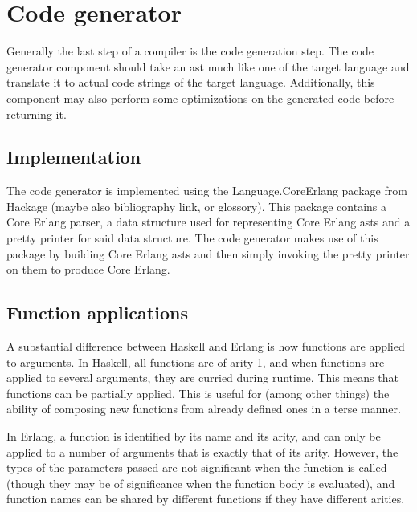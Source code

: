 \section{Code generator}


Generally the last step of a compiler is the code generation step. The code generator
component should take an \gls{ast} much like one of the target language and translate it
to actual code strings of the target language. Additionally, this component may also
perform some optimizations on the generated code before returning it.

\subsection{Implementation}

The code generator is implemented using the Language.CoreErlang \cite{CoreErlang} package
from Hackage (maybe also bibliography link, or glossory). This package contains a Core Erlang
parser, a data structure used for representing Core Erlang \gls{ast}s and a pretty printer for
said data structure. The code generator makes use of this package by building Core Erlang
\gls{ast}s and then simply invoking the pretty printer on them to  produce Core Erlang.

\subsection{Function applications}

A substantial difference between Haskell and Erlang is how functions are applied to arguments. 
In Haskell, all functions are of arity 1, and when functions are applied to several arguments, they are curried during runtime. This means that functions can be partially applied.%
This is useful for (among other things)
the ability of composing new functions from already defined ones in a terse manner.

In Erlang, a function is identified by its name and its arity, and can only be applied to a number of arguments that is exactly that of its arity. %
However, the types of the parameters passed are not significant when the function is called %
(though they may be of significance when the function body is evaluated), and function names can be shared by different functions if they have different arities.

